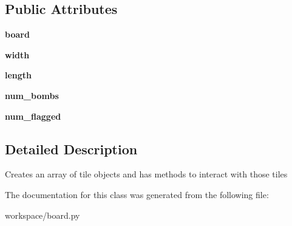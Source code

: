 \subsection*{Public Attributes}
\begin{DoxyCompactItemize}
\item 
\mbox{\label{classboard_1_1_board_aece806dcfd4c75f3cc8c0f5c8fd5c544}} 
{\bfseries board}
\item 
\mbox{\label{classboard_1_1_board_a96e3212b056035d81c4081b01be6eada}} 
{\bfseries width}
\item 
\mbox{\label{classboard_1_1_board_a3d1542390da10fc0a0ad7b7c10743ec2}} 
{\bfseries length}
\item 
\mbox{\label{classboard_1_1_board_a02ab9ac6c1ca1cc4d90de80a41238671}} 
{\bfseries num\+\_\+bombs}
\item 
\mbox{\label{classboard_1_1_board_a06330638cbfa0ae779bb1a149ad26bc4}} 
{\bfseries num\+\_\+flagged}
\end{DoxyCompactItemize}


\subsection{Detailed Description}
\begin{DoxyVerb}Creates an array of tile objects and has methods to interact with those tiles
\end{DoxyVerb}
 

The documentation for this class was generated from the following file\+:\begin{DoxyCompactItemize}
\item 
workspace/board.\+py\end{DoxyCompactItemize}
